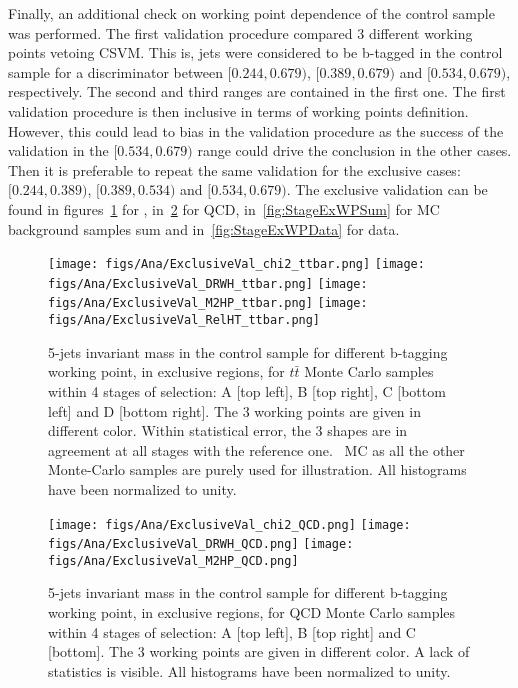 Finally, an additional check on working point dependence of the control sample was performed. The first validation procedure compared 3 different working points vetoing CSVM. This is, jets were considered to be b-tagged in the control sample for a discriminator between $[0.244,0.679)$, $[0.389,0.679)$ and $[0.534,0.679)$, respectively. The second and third ranges are contained in the first one. The first validation procedure is then inclusive in terms of working points definition. However, this could lead to bias in the validation procedure as the success of the validation in the $[0.534,0.679)$ range could drive the conclusion in the other cases. Then it is preferable to repeat the same validation for the exclusive cases: $[0.244,0.389)$, $[0.389,0.534)$ and $[0.534,0.679)$. The exclusive validation can be found in figures~\ref{fig:StageExWPttbar} for \ttbar, in~\ref{fig:StageExWPQCD} for QCD, in~\ref{fig:StageExWPSum} for MC background samples sum and in~\ref{fig:StageExWPData} for data. %

\begin{figure}[!Hhtbp]
  \begin{center}
    \texttt{[image: figs/Ana/ExclusiveVal\_chi2\_ttbar.png]}
    \texttt{[image: figs/Ana/ExclusiveVal\_DRWH\_ttbar.png]}
    \texttt{[image: figs/Ana/ExclusiveVal\_M2HP\_ttbar.png]}
    \texttt{[image: figs/Ana/ExclusiveVal\_RelHT\_ttbar.png]}
    \caption{5-jets invariant mass in the control sample for different b-tagging working point, in exclusive regions, for $t\bar{t}$ Monte Carlo samples within 4 stages of selection: A [top left], B [top right], C [bottom left] and D [bottom right]. The 3 working points are given in different color. Within statistical error, the 3 shapes are in agreement at all stages with the reference one. \ttbar~MC as all the other Monte-Carlo samples are purely used for illustration. All histograms have been normalized to unity.}
    \label{fig:StageExWPttbar}
  \end{center}
\end{figure}

\begin{figure}[!Hhtbp]
  \begin{center}
    \texttt{[image: figs/Ana/ExclusiveVal\_chi2\_QCD.png]}
    \texttt{[image: figs/Ana/ExclusiveVal\_DRWH\_QCD.png]}
    \texttt{[image: figs/Ana/ExclusiveVal\_M2HP\_QCD.png]}
    \caption{5-jets invariant mass in the control sample for different b-tagging working point, in exclusive regions, for QCD Monte Carlo samples within 4 stages of selection: A [top left], B [top right] and C [bottom]. The 3 working points are given in different color. A lack of statistics is visible. All histograms have been normalized to unity.}
    \label{fig:StageExWPQCD}
  \end{center}
\end{figure}


